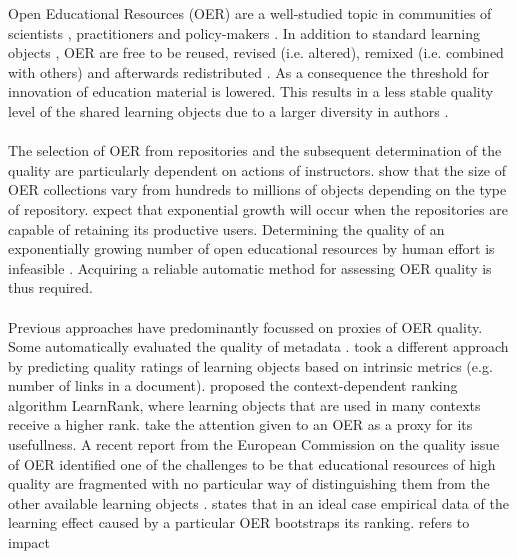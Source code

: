 Open Educational Resources (OER) are a well-studied topic in communities of
scientists \citep{Wiley2014, Hylen2012, Duval2010}, practitioners
\citep{Johnson2013, Yuan2013, Trendsurfoe2014} and policy-makers
\citep{Bussemaker2014,OECD2007}. In addition to standard learning objects
\citep{McGreal2004}, OER are free to be reused, revised (i.e. altered), remixed
(i.e. combined with others) and afterwards redistributed \citep{Hilton2010}. As
a consequence the threshold for innovation of education material is lowered.
This results in a less stable quality level of the shared learning objects due
to a larger diversity in authors \citep{Weller2010}.\\\\
\noindent
The selection of OER from repositories and the subsequent determination of the
quality are particularly dependent on actions of instructors. \citet{Ochoa2009a}
show that the size of OER collections vary from hundreds to
millions of objects depending on the type of repository. \citeauthor{Ochoa2009a}
expect that exponential growth will occur when the repositories are capable of
retaining its productive users. Determining the quality of an exponentially
growing number of open educational resources by human effort is infeasible
\citep{Cechinel2011, Ochoa2006, Zemsky2004}. Acquiring a reliable automatic
method for assessing OER quality is thus required.\\\\
\noindent
Previous approaches have predominantly focussed on proxies of OER quality. Some
automatically evaluated the quality of metadata \citep{Ochoa2009b, Tani2013}.
\citet{Cechinel2011, Cechinel2012} took a different approach by predicting quality ratings of
learning objects based on intrinsic metrics (e.g. number of links in a
document). \citet{Duval2006} proposed the context-dependent ranking algorithm
LearnRank, where learning objects that are used in many contexts receive a
higher rank. \citet{Ochoa2006} take the attention given to an OER as a
proxy for its usefullness.
A recent report from the European Commission on the quality issue of OER
identified one of the challenges to be that educational resources of high
quality are fragmented with no particular way of distinguishing them from the
other available learning objects \citep{Camilleri2014}. \citet{Duval2006}
states that in an ideal case empirical data of the learning effect caused by a
particular OER bootstraps its ranking. \citet{Camilleri2014} refers to impact
